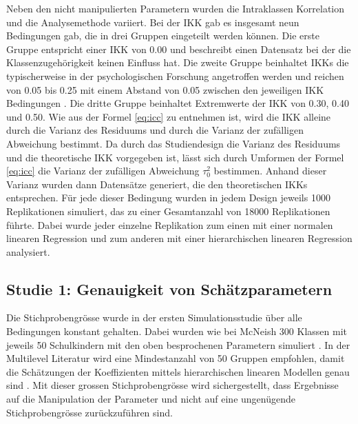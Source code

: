 \documentclass[12pt]{article}\usepackage[]{graphicx}\usepackage[]{color}
\begin{document}
Neben den nicht manipulierten Parametern wurden die Intraklassen Korrelation und die Analysemethode variiert. Bei der IKK gab es insgesamt neun Bedingungen gab, die in drei Gruppen eingeteilt werden können. Die erste Gruppe entspricht einer IKK von 0.00 und beschreibt einen Datensatz bei der die Klassenzugehörigkeit keinen Einfluss hat. Die zweite Gruppe beinhaltet IKKs die typischerweise in der psychologischen Forschung angetroffen werden und reichen von 0.05 bis 0.25 mit einem Abstand von 0.05 zwischen den jeweiligen IKK Bedingungen \citep{SnijdersTomA.B2012Ma:a}. Die dritte Gruppe beinhaltet Extremwerte der IKK von 0.30, 0.40 und 0.50. Wie aus der Formel \eqref{eq:icc} zu entnehmen ist, wird die IKK alleine durch die Varianz des Residuums und durch die Varianz der zufälligen Abweichung bestimmt. Da durch das Studiendesign die Varianz des Residuums und die theoretische IKK vorgegeben ist, lässt sich durch Umformen der Formel \eqref{eq:icc} die Varianz der zufälligen Abweichung $\tau^{2}_{0}$ bestimmen. Anhand dieser Varianz wurden dann Datensätze generiert, die den theoretischen IKKs entsprechen. Für jede dieser Bedingung wurden in jedem Design jeweils 1000 Replikationen simuliert, das zu einer Gesamtanzahl von 18000 Replikationen führte. Dabei wurde jeder einzelne Replikation zum einen mit einer normalen linearen Regression und zum anderen mit einer hierarchischen linearen Regression analysiert. 

\subsection{Studie 1: Genauigkeit von Schätzparametern}
Die Stichprobengrösse wurde in der ersten Simulationsstudie über alle Bedingungen konstant gehalten. Dabei wurden wie bei McNeish 300 Klassen mit jeweils 50 Schulkindern mit den oben besprochenen Parametern simuliert \citeyearpar{mcneish2014analyzing}. In der Multilevel Literatur wird eine Mindestanzahl von 50 Gruppen empfohlen, damit die Schätzungen der Koeffizienten mittels hierarchischen linearen Modellen genau sind \citep{maashox2005samplesize}. Mit dieser grossen Stichprobengrösse wird sichergestellt, dass Ergebnisse auf die Manipulation der Parameter und nicht auf eine ungenügende Stichprobengrösse zurückzuführen sind.
\end{document}
